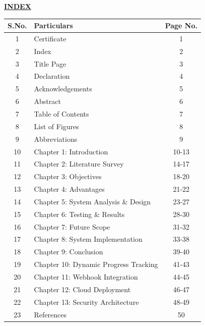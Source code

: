 ﻿\documentclass[12pt]{article}
\def\normaltext{\fontsize{12pt}{18pt}\color{secondary}}
\begin{document}
\begin{center}
\vspace{1cm}
{\LARGE\color{primary}\underline{\textbf{INDEX}}}
\vspace{2cm}
\end{center}
\normaltext
\begin{center}
\begin{tabular}{|c|l|c|}
\hline
\textbf{S.No.} & \textbf{Particulars} & \textbf{Page No.} \\ \hline
1 & Certificate & 1 \\ \hline
2 & Index & 2 \\ \hline
3 & Title Page & 3 \\ \hline
4 & Declaration & 4 \\ \hline
5 & Acknowledgements & 5 \\ \hline
6 & Abstract & 6 \\ \hline
7 & Table of Contents & 7 \\ \hline
8 & List of Figures & 8 \\ \hline
9 & Abbreviations & 9 \\ \hline
10 & Chapter 1: Introduction & 10-13 \\ \hline
11 & Chapter 2: Literature Survey & 14-17 \\ \hline
12 & Chapter 3: Objectives & 18-20 \\ \hline
13 & Chapter 4: Advantages & 21-22 \\ \hline
14 & Chapter 5: System Analysis \& Design & 23-27 \\ \hline
15 & Chapter 6: Testing \& Results & 28-30 \\ \hline
16 & Chapter 7: Future Scope & 31-32 \\ \hline
17 & Chapter 8: System Implementation & 33-38 \\ \hline
18 & Chapter 9: Conclusion & 39-40 \\ \hline
19 & Chapter 10: Dynamic Progress Tracking & 41-43 \\ \hline
20 & Chapter 11: Webhook Integration & 44-45 \\ \hline
21 & Chapter 12: Cloud Deployment & 46-47 \\ \hline
22 & Chapter 13: Security Architecture & 48-49 \\ \hline
23 & References & 50 \\ \hline
\end{tabular}
\end{center}
\newpage
\end{document}
